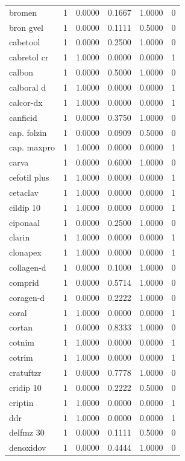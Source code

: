 \begin{longtable}{p{3.0cm}rrrrr}
bromen & 1 & 0.0000 & 0.1667 & 1.0000 & 0 \\
bron gvel & 1 & 0.0000 & 0.1111 & 0.5000 & 0 \\
cabetool & 1 & 0.0000 & 0.2500 & 1.0000 & 0 \\
cabretol cr & 1 & 1.0000 & 0.0000 & 0.0000 & 1 \\
calbon & 1 & 0.0000 & 0.5000 & 1.0000 & 0 \\
calboral d & 1 & 1.0000 & 0.0000 & 0.0000 & 1 \\
calcor-dx & 1 & 1.0000 & 0.0000 & 0.0000 & 1 \\
canficid & 1 & 0.0000 & 0.3750 & 1.0000 & 0 \\
cap. folzin & 1 & 0.0000 & 0.0909 & 0.5000 & 0 \\
cap. maxpro & 1 & 1.0000 & 0.0000 & 0.0000 & 1 \\
carva & 1 & 0.0000 & 0.6000 & 1.0000 & 0 \\
cefotil plus & 1 & 1.0000 & 0.0000 & 0.0000 & 1 \\
cetaclav & 1 & 1.0000 & 0.0000 & 0.0000 & 1 \\
cildip 10 & 1 & 1.0000 & 0.0000 & 0.0000 & 1 \\
ciponaal & 1 & 0.0000 & 0.2500 & 1.0000 & 0 \\
clarin & 1 & 1.0000 & 0.0000 & 0.0000 & 1 \\
clonapex & 1 & 1.0000 & 0.0000 & 0.0000 & 1 \\
collagen-d & 1 & 0.0000 & 0.1000 & 1.0000 & 0 \\
comprid & 1 & 0.0000 & 0.5714 & 1.0000 & 0 \\
coragen-d & 1 & 0.0000 & 0.2222 & 1.0000 & 0 \\
coral & 1 & 1.0000 & 0.0000 & 0.0000 & 1 \\
cortan & 1 & 0.0000 & 0.8333 & 1.0000 & 0 \\
cotnim & 1 & 1.0000 & 0.0000 & 0.0000 & 1 \\
cotrim & 1 & 1.0000 & 0.0000 & 0.0000 & 1 \\
cratuftzr & 1 & 0.0000 & 0.7778 & 1.0000 & 0 \\
cridip 10 & 1 & 0.0000 & 0.2222 & 0.5000 & 0 \\
criptin & 1 & 1.0000 & 0.0000 & 0.0000 & 1 \\
ddr & 1 & 1.0000 & 0.0000 & 0.0000 & 1 \\
delfmz 30 & 1 & 0.0000 & 0.1111 & 0.5000 & 0 \\
denoxidov & 1 & 0.0000 & 0.4444 & 1.0000 & 0 \\

\end{longtable}

